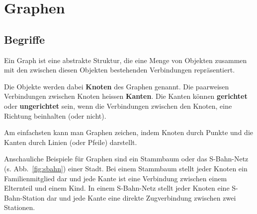 \section{Graphen}




\subsection{Begriffe}

Ein Graph ist eine abstrakte Struktur, die eine Menge von Objekten zusammen mit den zwischen diesen Objekten bestehenden Verbindungen repräsentiert. 

Die Objekte werden dabei \textbf{Knoten} des Graphen genannt. 
Die paarweisen Verbindungen zwischen Knoten heissen \textbf{Kanten}. 
Die Kanten können \textbf{gerichtet} oder \textbf{ungerichtet} sein, wenn die Verbindungen zwischen den Knoten, eine Richtung beinhalten (oder nicht).

Am einfachsten kann man Graphen zeichen, indem Knoten durch Punkte und die Kanten durch Linien (oder Pfeile) darstellt. 

\begin{mbsp}
Anschauliche Beispiele für Graphen sind ein Stammbaum oder das S-Bahn-Netz (s. Abb.~\ref{fig:sbahn}) einer Stadt. 
Bei einem Stammbaum stellt jeder Knoten ein Familienmitglied dar und jede Kante ist eine Verbindung zwischen einem Elternteil und einem Kind. 
In einem S-Bahn-Netz stellt jeder Knoten eine S-Bahn-Station dar und jede Kante eine direkte Zugverbindung zwischen zwei Stationen.
\end{mbsp}
%
%

